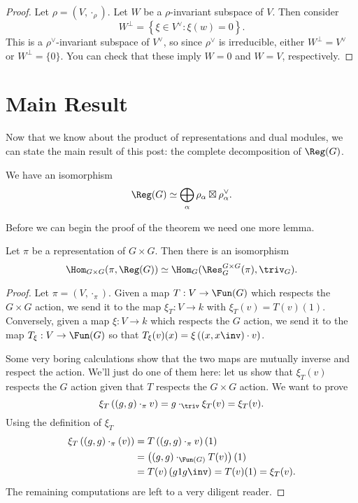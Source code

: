 \begin{proof}
	Let $\rho = (V, \cdot_\rho)$.
	Let $W$ be a $\rho$-invariant subspace of $V$.
	Then consider
	\[ W^\perp = \left\{ \xi \in V^\vee : \xi(w) = 0 \right\}. \]
	This is a $\rho^\vee$-invariant subspace of $V^\vee$,
	so since $\rho^\vee$ is irreducible,
	either $W^\perp = V^\vee$ or $W^\perp = \{0\}$.
	You can check that these imply $W=0$ and $W=V$, respectively.
\end{proof}

\section{Main Result}
Now that we know about the product of representations and dual modules,
we can state the main result of this post: the complete decomposition of $\Reg(G)$.

\begin{theorem}
	We have an isomorphism
	\[
		\Reg(G) \simeq
		\bigoplus_{\alpha} \rho_\alpha \boxtimes \rho_\alpha^\vee.
	\]
\end{theorem}
Before we can begin the proof of the theorem we need one more lemma.

\begin{lemma}
	Let $\pi$ be a representation of $G \times G$.
	Then there is an isomorphism
	\[ \Hom_{G \times G}(\pi, \Reg(G))
		\simeq \Hom_G(\Res^{G \times G}_G(\pi), \triv_G).
	\]
\end{lemma}
\begin{proof}
	Let $\pi = (V, \cdot_\pi)$.
	Given a map $T : V \to \Fun(G)$ which respects the $G \times G$ action,
	we send it to the map $\xi_T : V \to k$ with $\xi_T(v) = T(v)(1)$.
	Conversely, given a map $\xi : V \to k$ which respects the $G$ action, 
	we send it to the map $T_\xi : V \to \Fun(G)$
	so that $T_\xi(v)(x) = \xi\left( (x,x\inv) \cdot v \right)$.

	Some very boring calculations show that the two maps are mutually inverse and respect the action.
	We'll just do one of them here: let us show that $\xi_T(v)$ respects the $G$ action given that $T$ respects the $G \times G$ action.
	We want to prove
	\[ \xi_T\left( (g,g) \cdot_\pi v \right)
	= g \cdot_\triv \xi_T(v) = \xi_T(v). \]
	Using the definition of $\xi_T$
	\[
		\begin{aligned}
		\xi_T\left( (g,g) \cdot_\pi (v) \right)
		&= T\left( (g,g) \cdot_\pi v \right)(1) \\
		&= \left( (g,g) \cdot_{\Fun(G)} T(v) \right)(1) \\
		&= T(v)\left( g 1 g\inv \right) = T(v)(1) = \xi_T(v).
		\end{aligned}
	\]
	The remaining computations are left to a very diligent reader.
\end{proof}

